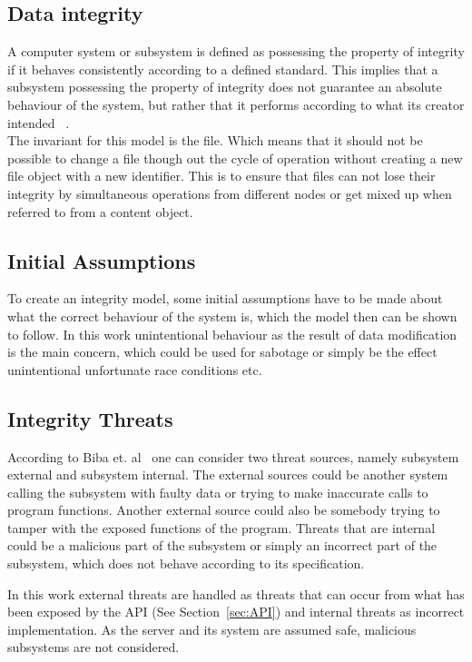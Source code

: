 \documentclass[a4paper,12pt]{article}
\begin{document}
\subsection{Data integrity}
A computer system or subsystem is defined as possessing the property of integrity if it behaves consistently
according to a defined standard. This implies that a subsystem possessing the property of integrity
does not guarantee an absolute behaviour of the system, but rather that it performs according to
what its creator intended ~\cite{BIBA}.
\\
The invariant for this model is the file. Which means that it should not be possible to
change a file though out the cycle of operation without creating a new file object with a new
identifier. This is to ensure that files can not lose their integrity by simultaneous
operations from different nodes or get mixed up when referred to from a content object. 

\subsection{Initial Assumptions}
To create an integrity model, some initial assumptions have to be made about what the correct
behaviour of the system is, which the model then can be shown to follow. In this work unintentional
behaviour as the result of data modification is the main concern, which could be used for sabotage
or simply be the effect unintentional unfortunate race conditions etc. 

\subsection{Integrity Threats}
According to Biba et. al~\cite{BIBA} one can consider two threat sources, namely subsystem external
and subsystem internal. The external sources could be another system calling the subsystem with
faulty data or trying to make inaccurate calls to program functions. Another external source could
also be somebody trying to tamper with the exposed functions of the program. Threats that are
internal could be a malicious part of the subsystem or simply an incorrect part of the subsystem,
which does not behave according to its specification.

In this work external threats are handled as threats that can occur from what has been exposed by
the API (See Section~\ref{sec:API}) and internal threats as incorrect implementation. As the server
and its system are assumed safe, malicious subsystems are not considered.
\end{document}
